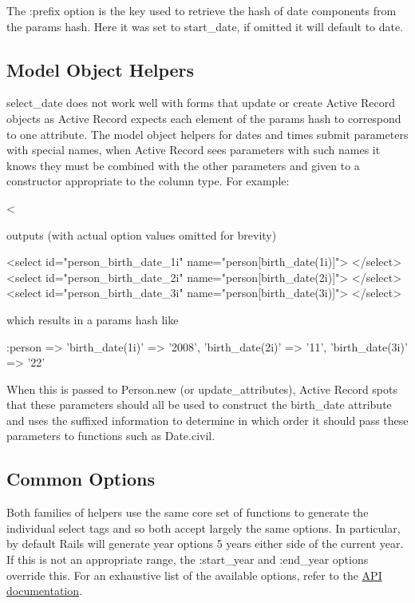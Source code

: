 \documentclass[10pt]{book}
\newenvironment{code}{%
  \scriptsize
    \verbatim
}{%
    \endverbatim
    \newline
}
\begin{document}
The :prefix option is the key used to retrieve the hash of date components from the params hash. Here it was set to start\_date, if omitted it will default to date.

\subsection{ Model Object Helpers}

select\_date does not work well with forms that update or create Active Record objects as Active Record expects each element of the params  hash to correspond to one attribute. The model object helpers for dates and times submit parameters with  special names, when Active Record sees parameters with such names it  knows they must be combined with the other parameters and given to a  constructor appropriate to the column type. For example:
\begin{code}
<%
\end{code}

outputs (with actual option values omitted for brevity)
\begin{code}
<select id="person_birth_date_1i" name="person[birth_date(1i)]">
</select>
<select id="person_birth_date_2i" name="person[birth_date(2i)]">
</select>
<select id="person_birth_date_3i" name="person[birth_date(3i)]">
</select>
\end{code}

which results in a params hash like
\begin{code}
{:person => {'birth_date(1i)' => '2008', 
'birth_date(2i)' => '11', 'birth_date(3i)' => '22'}}
\end{code}

When this is passed to Person.new (or update\_attributes), Active Record spots that these parameters should all be used to construct the birth\_date attribute and uses the suffixed information to determine in which order it should pass these parameters to functions such as Date.civil.

\subsection{ Common Options}

Both families of helpers use the same core set of functions to  generate the individual select tags and so both accept largely the same  options. In particular, by default Rails will generate year options 5  years either side of the current year. If this is not an appropriate  range, the :start\_year and :end\_year options override this. For an exhaustive list of the available options, refer to the \href{http://api.rubyonrails.org/classes/ActionView/Helpers/DateHelper.html}{API documentation}.
\end{document}
